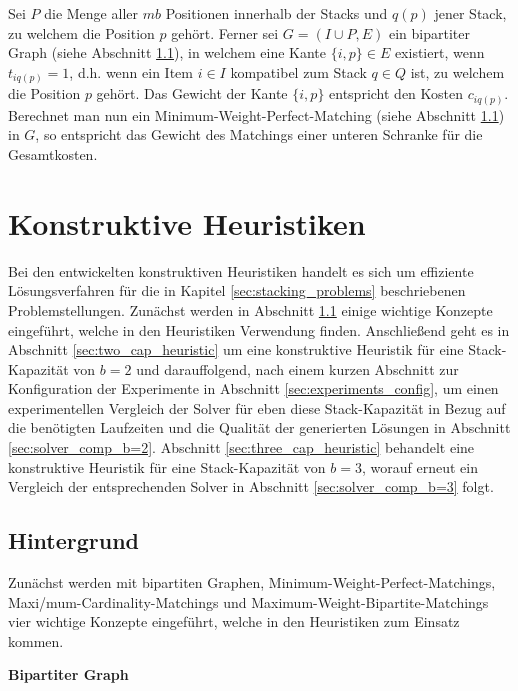 Sei $P$ die Menge aller $mb$ Positionen innerhalb der Stacks und $q(p)$ jener Stack, zu welchem die Position $p$ gehört.
Ferner sei $G = (I \cup P, E)$ ein bipartiter Graph (siehe Abschnitt \ref{sec:digressions}), in welchem eine Kante $\{i, p\} \in E$ existiert, wenn $t_{iq(p)} = 1$, d.h. wenn ein Item $i \in I$ kompatibel zum Stack $q \in Q$ ist, zu welchem die Position $p$ gehört. Das Gewicht der Kante $\{i, p\}$ entspricht den Kosten $c_{iq(p)}$. Berechnet man nun ein
Minimum-Weight-Perfect-Matching (siehe Abschnitt \ref{sec:digressions}) in $G$, so entspricht das Gewicht des Matchings einer unteren Schranke für die Gesamtkosten.

\vfill
\pagebreak

\section{Konstruktive Heuristiken}
\label{sec:constructive_heuristics}

Bei den entwickelten konstruktiven Heuristiken handelt es sich um effiziente Lösungsverfahren für die in Kapitel \ref{sec:stacking_problems} beschriebenen Problemstellungen. Zunächst werden in Abschnitt \ref{sec:digressions} einige wichtige Konzepte eingeführt, welche in den Heuristiken Verwendung finden.
Anschließend geht es in Abschnitt \ref{sec:two_cap_heuristic} um eine konstruktive Heuristik für eine Stack-Kapazität
von $b = 2$ und darauffolgend, nach einem kurzen Abschnitt zur Konfiguration der Experimente in Abschnitt \ref{sec:experiments_config}, um einen experimentellen Vergleich der Solver für eben diese Stack-Kapazität in Bezug
auf die benötigten Laufzeiten und die Qualität der generierten Lösungen in Abschnitt \ref{sec:solver_comp_b=2}.
Abschnitt \ref{sec:three_cap_heuristic} behandelt eine konstruktive Heuristik für eine Stack-Kapazität von $b=3$, worauf erneut ein Vergleich der entsprechenden Solver in Abschnitt \ref{sec:solver_comp_b=3} folgt.

\subsection{Hintergrund}
\label{sec:digressions}

Zunächst werden mit bipartiten Graphen, Minimum-Weight-Perfect-Matchings, Maxi\-/mum-Cardinality-Matchings und Maximum-Weight-Bipartite-Matchings vier wichtige Konzepte eingeführt, welche in den Heuristiken zum Einsatz kommen.\newline

\textbf{Bipartiter Graph}

